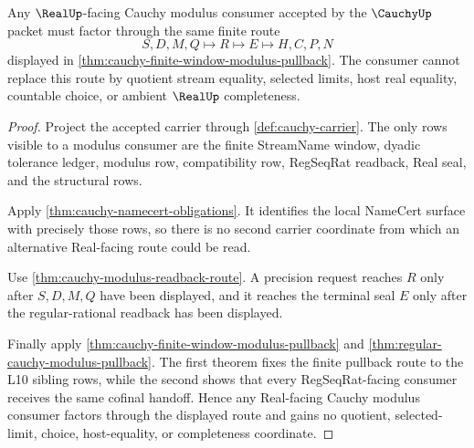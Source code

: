 \begin{theorem}\label{thm:cauchy-finite-window-pullback-uniqueness}
Any $\RealUp$-facing Cauchy modulus consumer accepted by the $\CauchyUp$ packet must factor through the same finite route
$$
S,D,M,Q \longmapsto R \longmapsto E \longmapsto H,C,P,N
$$
displayed in \autoref{thm:cauchy-finite-window-modulus-pullback}. The consumer cannot replace this route by quotient stream equality, selected limits, host real equality, countable choice, or ambient $\RealUp$ completeness.
\end{theorem}
\begin{proof}
Project the accepted carrier through \autoref{def:cauchy-carrier}. The only rows visible to a modulus consumer are the finite StreamName window, dyadic tolerance ledger, modulus row, compatibility row, RegSeqRat readback, Real seal, and the structural rows.

Apply \autoref{thm:cauchy-namecert-obligations}. It identifies the local NameCert surface with precisely those rows, so there is no second carrier coordinate from which an alternative Real-facing route could be read.

Use \autoref{thm:cauchy-modulus-readback-route}. A precision request reaches $R$ only after $S,D,M,Q$ have been displayed, and it reaches the terminal seal $E$ only after the regular-rational readback has been displayed.

Finally apply \autoref{thm:cauchy-finite-window-modulus-pullback} and \autoref{thm:regular-cauchy-modulus-pullback}. The first theorem fixes the finite pullback route to the L10 sibling rows, while the second shows that every RegSeqRat-facing consumer receives the same cofinal handoff. Hence any Real-facing Cauchy modulus consumer factors through the displayed route and gains no quotient, selected-limit, choice, host-equality, or completeness coordinate.
\end{proof}
